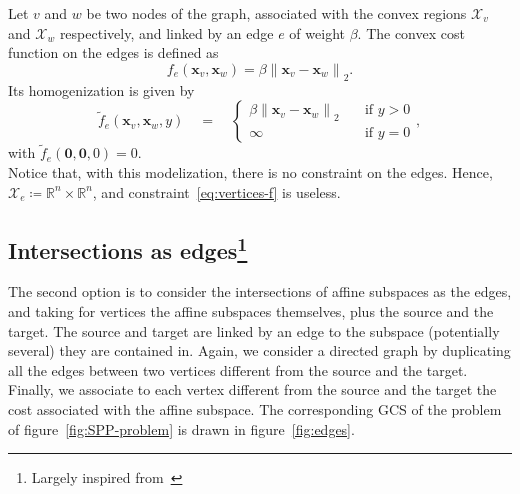 \documentclass[a4paper, 12pt]{article}
\newlength{\indentsize}
\begin{document}
\hspace{\indentsize} Let $v$ and $w$ be two nodes of the graph, associated with the convex regions $\mathcal{X}_v$ and $\mathcal{X}_w$ respectively, and linked by an edge $e$ of weight $\beta$. The convex cost function on the edges is defined as
\begin{equation*}\label{eq:f_e}
    f_e(\mathbf{x}_v, \mathbf{x}_w) = \beta {\lVert \mathbf{x}_v - \mathbf{x}_w \rVert}_2.
\end{equation*}
Its homogenization is given by
\begin{equation*}
    \tilde{f}_e(\mathbf{x}_v, \mathbf{x}_w, y) \quad = \quad \begin{cases} \beta {\lVert \mathbf{x}_v - \mathbf{x}_w \rVert}_2 & \quad \text{if $y > 0$} \\ \infty & \quad \text{if $y = 0$}\end{cases},
\end{equation*}
with $\tilde{f}_e(\mathbf{0}, \mathbf{0}, 0) = 0$.\\
Notice that, with this modelization, there is no constraint on the edges. Hence, $\mathcal{X}_e \coloneq \mathbb{R}^n \times \mathbb{R}^n$, and constraint~\ref{eq:vertices-f} is useless.

\subsection{Intersections as edges\protect\footnote{Largely inspired from~\cite[Chapter 11.2]{Tobia}}}\label{subsec:edges}
\hspace{\indentsize} The second option is to consider the intersections of affine subspaces as the edges, and taking for vertices the affine subspaces themselves, plus the source and the target. The source and target are linked by an edge to the subspace (potentially several) they are contained in. Again, we consider a directed graph by duplicating all the edges between two vertices different from the source and the target. Finally, we associate to each vertex different from the source and the target the cost associated with the affine subspace. The corresponding GCS of the problem of figure~\ref{fig:SPP-problem} is drawn in figure~\ref{fig:edges}.
\end{document}
